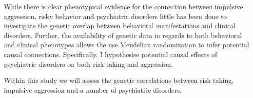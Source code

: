 While there is clear phenotypical evidence for the connection between impulsive aggression, risky behavior and psychiatric disorders little has been done to investigate the genetic overlap between behavioral manifestations and clinical disorders.
Further, the availability of genetic data in regards to both behavioral and clinical phenotypes allows the use Mendelian randomization to infer potential causal connections.
Specifically, I hypothesise potential causal effects of psychiatric disorders on both risk taking and aggression.

Within this study we will assess the genetic correlations between risk taking, impulsive aggression and a number of psychiatric disorders.
